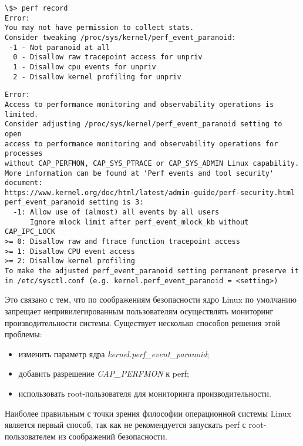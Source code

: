 \noindent\begin{minipage}{\linewidth}
\begin{lstlisting}[style=CodeListing, label=sec_tech:code:perf_err1, caption={Первый вариант ошибки, встречающейся после установки утилиты}]
\$> perf record
Error:
You may not have permission to collect stats.
Consider tweaking /proc/sys/kernel/perf_event_paranoid:
 -1 - Not paranoid at all
  0 - Disallow raw tracepoint access for unpriv
  1 - Disallow cpu events for unpriv
  2 - Disallow kernel profiling for unpriv
\end{lstlisting}

\begin{lstlisting}[style=CodeListing, label=sec_tech:code:perf_err2, caption={Второй вариант ошибки, встречающейся после установки утилиты}]
Error:
Access to performance monitoring and observability operations is limited.
Consider adjusting /proc/sys/kernel/perf_event_paranoid setting to open
access to performance monitoring and observability operations for processes
without CAP_PERFMON, CAP_SYS_PTRACE or CAP_SYS_ADMIN Linux capability.
More information can be found at 'Perf events and tool security' document:
https://www.kernel.org/doc/html/latest/admin-guide/perf-security.html
perf_event_paranoid setting is 3:
  -1: Allow use of (almost) all events by all users
      Ignore mlock limit after perf_event_mlock_kb without CAP_IPC_LOCK
>= 0: Disallow raw and ftrace function tracepoint access
>= 1: Disallow CPU event access
>= 2: Disallow kernel profiling
To make the adjusted perf_event_paranoid setting permanent preserve it
in /etc/sysctl.conf (e.g. kernel.perf_event_paranoid = <setting>)
\end{lstlisting}
\end{minipage}

Это связано с тем, что по соображениям безопасности ядро Linux по умолчанию запрещает непривилегированным пользователям 
осуществлять мониторинг производительности системы. Существует несколько способов решения этой проблемы:

\begin{itemize}
    \item изменить параметр ядра \textit{kernel.perf\_event\_paranoid};
    \item добавить разрешение \textit{CAP\_PERFMON} к perf;
    \item использовать root-пользователя для мониторинга производительности.
\end{itemize}

Наиболее правильным с точки зрения философии операционной системы Linux является первый способ, 
так как не рекомендуется запускать perf с root-пользователем из соображений безопасности.

